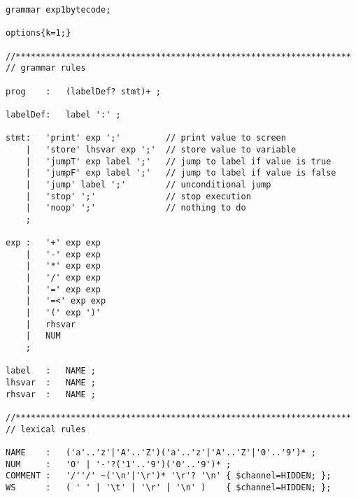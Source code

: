 \begin{minipage}{4.8in}
\begin{lstlisting}[frame=single,language=antlr]
grammar exp1bytecode;

options{k=1;}

//*******************************************************************
// grammar rules

prog 	:	(labelDef? stmt)+ ;

labelDef:	label ':' ;

stmt:	'print' exp ';'			// print value to screen
	|	'store' lhsvar exp ';'	// store value to variable
	|	'jumpT' exp label ';'	// jump to label if value is true
	|	'jumpF' exp label ';'	// jump to label if value is false
	|	'jump' label ';'		// unconditional jump
	|	'stop' ';'				// stop execution
	|	'noop' ';'				// nothing to do
	;

exp	:	'+' exp exp
	|	'-' exp exp
	|	'*' exp exp
	|	'/' exp exp
	|	'=' exp exp
	|	'=<' exp exp
	|	'(' exp ')'
	|	rhsvar
	|	NUM
	;
	
label	:	NAME ;
lhsvar	:	NAME ;
rhsvar	:	NAME ;

//*******************************************************************
// lexical rules

NAME	:	('a'..'z'|'A'..'Z')('a'..'z'|'A'..'Z'|'0'..'9')* ;
NUM		:	'0' | '-'?('1'..'9')('0'..'9')* ;
COMMENT :   '/''/' ~('\n'|'\r')* '\r'? '\n'	{ $channel=HIDDEN; };
WS  	:   ( ' ' | '\t' | '\r' | '\n' ) 	{ $channel=HIDDEN; };

\end{lstlisting}
\end{minipage}